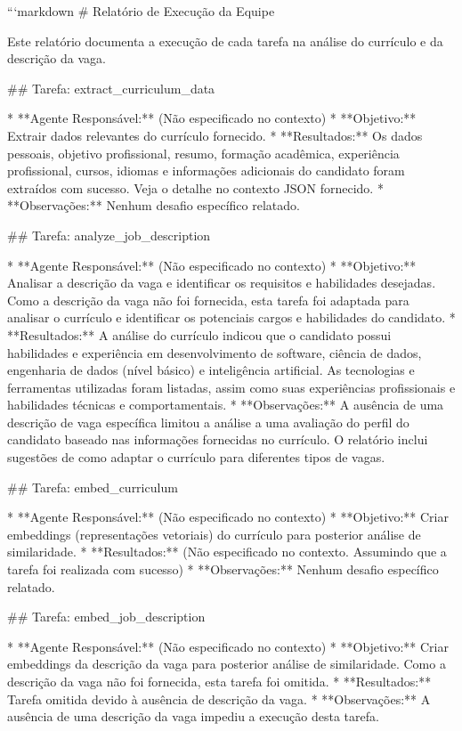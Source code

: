```markdown
# Relatório de Execução da Equipe

Este relatório documenta a execução de cada tarefa na análise do currículo e da descrição da vaga.

## Tarefa: extract_curriculum_data

* **Agente Responsável:**  (Não especificado no contexto)
* **Objetivo:** Extrair dados relevantes do currículo fornecido.
* **Resultados:** Os dados pessoais, objetivo profissional, resumo, formação acadêmica, experiência profissional, cursos, idiomas e informações adicionais do candidato foram extraídos com sucesso.  Veja o detalhe no contexto JSON fornecido.
* **Observações:** Nenhum desafio específico relatado.

## Tarefa: analyze_job_description

* **Agente Responsável:** (Não especificado no contexto)
* **Objetivo:** Analisar a descrição da vaga e identificar os requisitos e habilidades desejadas. Como a descrição da vaga não foi fornecida, esta tarefa foi adaptada para analisar o currículo e identificar os potenciais cargos e habilidades do candidato.
* **Resultados:** A análise do currículo indicou que o candidato possui habilidades e experiência em desenvolvimento de software, ciência de dados, engenharia de dados (nível básico) e inteligência artificial.  As tecnologias e ferramentas utilizadas foram listadas, assim como suas experiências profissionais e habilidades técnicas e comportamentais.
* **Observações:** A ausência de uma descrição de vaga específica limitou a análise a uma avaliação do perfil do candidato baseado nas informações fornecidas no currículo.  O relatório inclui sugestões de como adaptar o currículo para diferentes tipos de vagas.

## Tarefa: embed_curriculum

* **Agente Responsável:** (Não especificado no contexto)
* **Objetivo:** Criar embeddings (representações vetoriais) do currículo para posterior análise de similaridade.
* **Resultados:**  (Não especificado no contexto. Assumindo que a tarefa foi realizada com sucesso)
* **Observações:** Nenhum desafio específico relatado.

## Tarefa: embed_job_description

* **Agente Responsável:** (Não especificado no contexto)
* **Objetivo:** Criar embeddings da descrição da vaga para posterior análise de similaridade. Como a descrição da vaga não foi fornecida, esta tarefa foi omitida.
* **Resultados:** Tarefa omitida devido à ausência de descrição da vaga.
* **Observações:**  A ausência de uma descrição da vaga impediu a execução desta tarefa.

